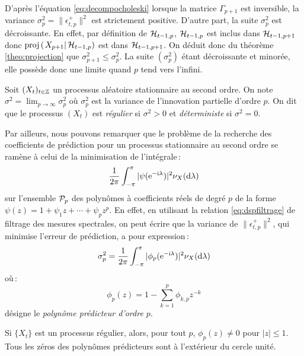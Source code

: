 D'apr\`es l'\'equation \eqref{eq:decompocholeski} lorsque la
matrice $\Gamma_{p+1}$ est inversible, la variance
$\sigma_p^2=\|\epsilon_{t,p}^+\|^2$ est strictement positive.
D'autre part, la suite $\sigma_p^2$ est
d\'ecroissante. En effet, par d\'efinition de $\mathcal{H}_{t-1,p}$,
$\mathcal{H}_{t-1,p}$ est inclus dans $\mathcal{H}_{t-1,p+1}$ donc
$\proj{X_{p+1}}{\cH_{t-1,p}}$ est dans $\mathcal{H}_{t-1,p+1}$.
On d\'eduit donc du th\'eor\`eme \ref{theo:projection} que $\sigma_{p+1}^2\leq\sigma_{p}^2$.
La suite $(\sigma_p^2)$ \'etant d\'ecroissante et minor\'ee, elle poss\`ede
donc une limite quand $p$ tend vers l'infini.

\begin{definition}
 \label{def:paregulier}
 Soit $(X_t)_{t \in \mathbb{Z}}$ un processus al\'eatoire stationnaire au second
ordre. On note $\sigma^2=\lim_{p\to\infty}\sigma_p^2$ o\`u
$\sigma_p^2$ est la variance de l'innovation partielle
d'ordre $p$. On dit que le processus $(X_t)$ est \emph{r\'egulier} si
$\sigma^2 > 0$ et \emph{d\'eterministe} si $\sigma^2=0$.
\end{definition}


Par ailleurs, nous pouvons remarquer que le probl\`eme de la recherche des coefficients de pr\'ediction pour
un processus stationnaire au second ordre se ram\`ene \`a
celui de la minimisation de l'int\'egrale\,:
\[
   \frac{1}{2\pi}
             \int_{-\pi}^{\pi} |\psi(\mathrm{e}^{-\mathrm{i}\lambda})|^2 \nu_X(\mathrm{d}\lambda)
\]
sur l'ensemble $\mathcal{P}_p$ des polyn\^omes \`a coefficients r\'eels
de degr\'e $p$ de la forme $\psi(z) = 1 + \psi_1 z + \cdots + \psi_p
z^p$. En effet, en utilisant la relation \eqref{eq:dspfiltrage} de
filtrage des mesures spectrales, on peut \'ecrire que la variance de
$ \| \epsilon_{t,p}^+ \|^2$, qui minimise l'erreur de
pr\'ediction, a pour expression\,:
\begin{equation}
\label{eq:variance:innovation:partielle}
 \sigma_p^2
 = \frac{1}{2 \pi} \int_{-\pi}^{\pi} |
    \phi_p(\mathrm{e}^{-\mathrm{i}\lambda})|^2 \nu_X(\mathrm{d}\lambda)
\end{equation}
o\`u\,:
\[
  \phi_p(z) = 1 - \sum_{k=1}^p \phi_{k,p} z^{-k}
\]
d\'esigne le \emph{polyn\^ome pr\'edicteur d'ordre $p$}.
\begin{theorem}
 \label{theo:procregulpredicstable}
 Si $\{ X_t \}$ est un processus r\'egulier, alors, pour
tout $p$, $\phi_p(z) \ne 0$ pour $|z|\leq 1$. Tous les z\'eros des
polyn\^omes pr\'edicteurs sont \`a l'ext\'erieur du cercle unit\'e.
\end{theorem}

